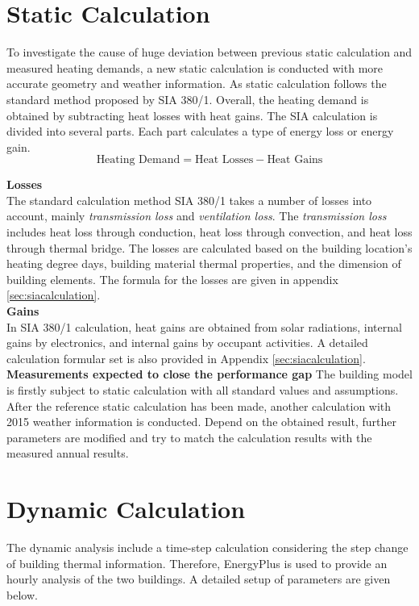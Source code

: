 \documentclass[a4paper, oneside]{discothesis}
\begin{document}
	\section{Static Calculation}
		To investigate the cause of huge deviation between previous static calculation and measured heating demands, a new static calculation is conducted with more accurate geometry and weather information. As static calculation follows the standard method proposed by SIA 380/1. Overall, the heating demand is obtained by subtracting heat losses with heat gains. The SIA calculation is divided into several parts. Each part calculates a type of energy loss or energy gain. \\
		\[\text{Heating Demand} = \text{Heat Losses} - \text{Heat Gains}\]
		
		\textbf{Losses}\\
			The standard calculation method SIA 380/1 takes a number of losses into account, mainly \textit{transmission loss} and \textit{ventilation loss}. The \textit{transmission loss} includes heat loss through conduction, heat loss through convection, and heat loss through thermal bridge. The losses are calculated based on the building location's heating degree days, building material thermal properties, and the dimension of building elements. The formula for the losses are given in appendix \ref{sec:siacalculation}.\\

		\textbf{Gains}\\
			In SIA 380/1 calculation, heat gains are obtained from solar radiations, internal gains by electronics, and internal gains by occupant activities. A detailed calculation formular set is also provided in Appendix \ref{sec:siacalculation}.\\
			
		\textbf{Measurements expected to close the performance gap}
			The building model is firstly subject to static calculation with all standard values and assumptions. After the reference static calculation has been made, another calculation with 2015 weather information is conducted. Depend on the obtained result, further parameters are modified and try to match the calculation results with the measured annual results.

		
	\section{Dynamic Calculation}
		The dynamic analysis include a time-step calculation considering the step change of building thermal information. Therefore, EnergyPlus is used to provide an hourly analysis of the two buildings. A detailed setup of parameters are given below.
		
\end{document}
